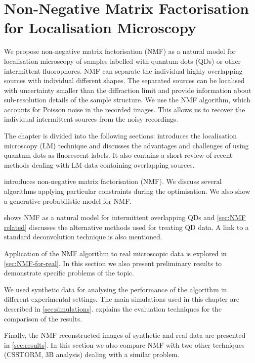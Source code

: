 \chapter{Non-Negative Matrix Factorisation for Localisation Microscopy\label{ch:NMF}}

We propose non-negative matrix factorisation (NMF) as a natural model for localisation microscopy of samples labelled with quantum dots (QDs) or other intermittent fluorophores. NMF can separate the individual highly overlapping sources with individual different shapes. The separated sources can be localised with uncertainty smaller than the diffraction limit and provide information about sub-resolution details of the sample structure. We use the NMF algorithm, which accounts for Poisson noise in the recorded images. This allows us to recover the individual intermittent sources from the noisy recordings.

The chapter is divided into the following sections:  introduces the localisation microscopy (LM) technique and discusses the advantages and challenges of using quantum dots as fluorescent labels. It also contains a short review of recent methods dealing with LM data containing overlapping sources. 

 introduces non-negative matrix factorisation (NMF). We discuss several algorithms applying particular constraints during the optimisation. We also show a generative probabilistic model for NMF.

 shows NMF as a natural model for intermittent overlapping QDs and \autoref{sec:NMF related} discusses the alternative methods used for treating QD data. A link to a standard deconvolution technique is also mentioned. 

Application of the NMF algorithm to real microscopic data is explored in \autoref{sec:NMF-for-real}. In this section we also present preliminary results to demonstrate specific problems of the topic.

We used synthetic data for analysing the performance of the algorithm in different experimental settings. The main simulations used in this chapter are described in \autoref{sec:simulations}.  explains the evaluation techniques for the comparison of the results.

Finally, the NMF reconstructed images of synthetic and real data are presented in \autoref{sec:results}. In this section we also compare NMF with two other techniques (CSSTORM, 3B analysis) dealing with a similar problem. 

